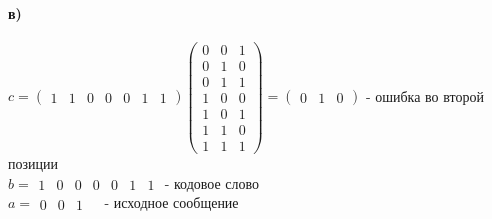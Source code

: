\documentclass[a4paper, 12pt]{article}
\begin{document}
\paragraph{в)} $ c = \begin{pmatrix}
    1 & 1 & 0 & 0 & 0 & 1 & 1
\end{pmatrix} \begin{pmatrix}
    0 & 0 & 1 \\
    0 & 1 & 0 \\
    0 & 1 & 1 \\
    1 & 0 & 0 \\
    1 & 0 & 1 \\
    1 & 1 & 0 \\
    1 & 1 & 1
\end{pmatrix} = \begin{pmatrix}
    0 & 1 & 0
\end{pmatrix}$ - ошибка во второй позиции \\ $ b = \begin{matrix}
    1 & 0 & 0 & 0 & 0 & 1 & 1
\end{matrix} $ - кодовое слово \\ 
$ a = \begin{matrix}
    0 & 0 & 1 &
\end{matrix} $ - исходное сообщение
\end{document}
